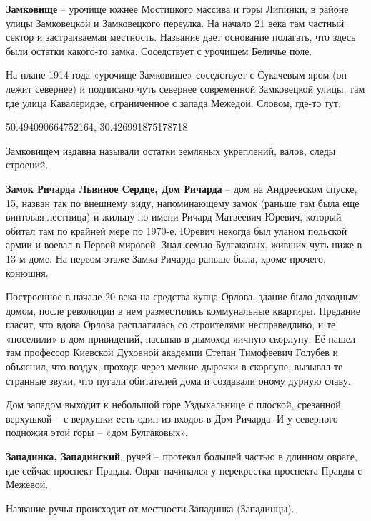 \medskip

\textbf{Замковище} – урочище южнее Мостицкого массива и горы Липинки, в районе улицы Замковецкой и Замковецкого переулка. На начало 21 века там частный сектор и застраиваемая местность. Название дает основание полагать, что здесь были остатки какого-то замка. Соседствует с урочищем Беличье поле.

На плане 1914 года «урочище Замковище» соседствует с Сукачевым яром (он лежит севернее) и подписано чуть севернее современной Замковецкой улицы, там где улица Кавалеридзе, ограниченное с запада Межедой. Словом, где-то тут:

50.494090664752164, 30.426991875178718

Замковищем издавна называли остатки земляных укреплений, валов, следы строений.\\ 

\medskip

\textbf{Замок Ричарда Львиное Сердце, Дом Ричарда} – дом на Андреевском спуске, 15, назван так по внешнему виду, напоминающему замок (раньше там была еще винтовая лестница) и жильцу по имени Ричард Матвеевич Юревич, который обитал там по крайней мере по 1970-е. Юревич некогда был уланом польской армии и воевал в Первой мировой. Знал семью Булгаковых, живших чуть ниже в 13-м доме. На первом этаже Замка Ричарда раньше была, кроме прочего, конюшня.

Построенное в начале 20 века на средства купца Орлова, здание было доходным домом, после революции в нем разместились коммунальные квартиры. Предание гласит, что вдова Орлова расплатилась со строителями несправедливо, и те «поселили» в дом привидений, насыпав в дымоход яичную скорлупу. Её нашел там профессор Киевской Духовной академии Степан Тимофеевич Голубев и объяснил, что воздух, проходя через мелкие дырочки в скорлупе, вызывал те странные
звуки, что пугали обитателей дома и создавали оному дурную славу.

Дом западом выходит к небольшой горе Уздыхальнице с плоской, срезанной верхушкой – с верхушки есть один из входов в Дом Ричарда. И у северного подножия этой горы – «дом Булгаковых».\\ 

\medskip

\textbf{Западинка, Западинский}, ручей – протекал большей частью в длинном овраге, где сейчас проспект Правды. Овраг начинался у перекрестка проспекта Правды с Межевой.
 
Название ручья происходит от местности Западинка (Западинцы). 

